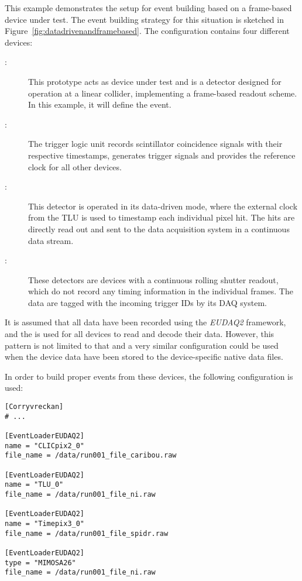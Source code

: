 This example demonstrates the setup for event building based on a frame-based device under test.
The event building strategy for this situation is sketched in Figure~\ref{fig:datadrivenandframebased}.
The configuration contains four different devices:
\begin{description}
        \item[:] This prototype acts as device under test and is a detector designed for operation at a linear collider, implementing a frame-based readout scheme. In this example, it will define the event.
        \item[:] The trigger logic unit records scintillator coincidence signals with their respective timestamps, generates trigger signals and provides the reference clock for all other devices.
        \item[:] This detector is operated in its data-driven mode, where the external clock from the TLU is used to timestamp each individual pixel hit. The hits are directly read out and sent to the data acquisition system in a continuous data stream.
        \item[:] These detectors are devices with a continuous rolling shutter readout, which do not record any timing information in the individual frames. The data are tagged with the incoming trigger IDs by its DAQ system.
\end{description}

It is assumed that all data have been recorded using the \emph{EUDAQ2} framework, and the  is used for all devices to read and decode their data.
However, this pattern is not limited to that and a very similar configuration could be used when the device data have been stored to the device-specific native data files.

In order to build proper events from these devices, the following configuration is used:

\begin{verbatim}
[Corryvreckan]
# ...

[EventLoaderEUDAQ2]
name = "CLICpix2_0"
file_name = /data/run001_file_caribou.raw

[EventLoaderEUDAQ2]
name = "TLU_0"
file_name = /data/run001_file_ni.raw

[EventLoaderEUDAQ2]
name = "Timepix3_0"
file_name = /data/run001_file_spidr.raw

[EventLoaderEUDAQ2]
type = "MIMOSA26"
file_name = /data/run001_file_ni.raw
\end{verbatim}

